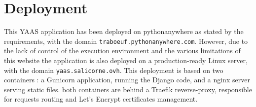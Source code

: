\documentclass[a4paper, 11pt]{report}
\begin{document}
    \section{Deployment}

    This YAAS application has been deployed on pythonanywhere as stated by the requirements, with the domain \texttt{traboeuf.pythonanywhere.com}. However, due to the lack of control of the execution environment and the various limitations of this website the application is also deployed on a production-ready Linux server, with the domain \texttt{yaas.salicorne.ovh}. This deployment is based on two containers : a Gunicorn application, running the Django code, and a nginx server serving static files. both containers are behind a Traefik reverse-proxy, responsible for requests routing and Let's Encrypt certificates management. 
 
\end{document}
